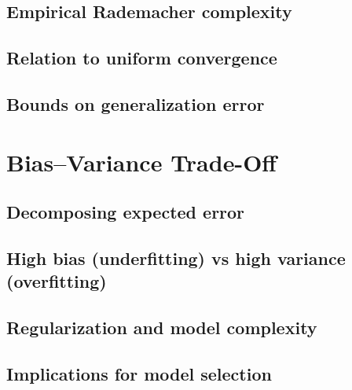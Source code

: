 \subsection{Empirical Rademacher complexity}
\subsection{Relation to uniform convergence}
\subsection{Bounds on generalization error}

\section{Bias--Variance Trade-Off}
\subsection{Decomposing expected error}
\subsection{High bias (underfitting) vs high variance (overfitting)}
\subsection{Regularization and model complexity}
\subsection{Implications for model selection}